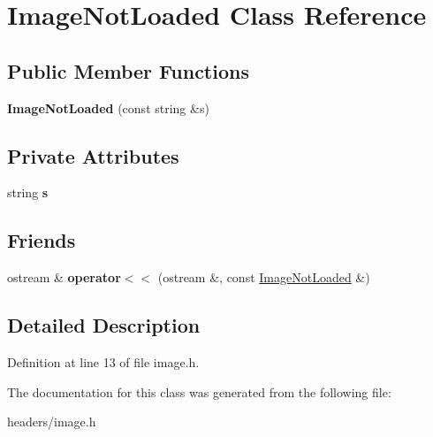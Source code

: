 \hypertarget{classImageNotLoaded}{\section{Image\+Not\+Loaded Class Reference}
\label{classImageNotLoaded}
}
\subsection*{Public Member Functions}
\begin{DoxyCompactItemize}
\item 
\hypertarget{classImageNotLoaded_aad9b5b31181586b4b2f8bd2edb39a6c0}{{\bfseries Image\+Not\+Loaded} (const string \&s)}\label{classImageNotLoaded_aad9b5b31181586b4b2f8bd2edb39a6c0}

\end{DoxyCompactItemize}
\subsection*{Private Attributes}
\begin{DoxyCompactItemize}
\item 
\hypertarget{classImageNotLoaded_a28c737d646a7aab6e417ab9929ca1dc9}{string {\bfseries s}}\label{classImageNotLoaded_a28c737d646a7aab6e417ab9929ca1dc9}

\end{DoxyCompactItemize}
\subsection*{Friends}
\begin{DoxyCompactItemize}
\item 
\hypertarget{classImageNotLoaded_a8ebdf991e0e46c984ea27be29dc112fd}{ostream \& {\bfseries operator$<$$<$} (ostream \&, const \hyperlink{classImageNotLoaded}{Image\+Not\+Loaded} \&)}\label{classImageNotLoaded_a8ebdf991e0e46c984ea27be29dc112fd}

\end{DoxyCompactItemize}


\subsection{Detailed Description}


Definition at line 13 of file image.\+h.



The documentation for this class was generated from the following file\+:\begin{DoxyCompactItemize}
\item 
headers/image.\+h\end{DoxyCompactItemize}

